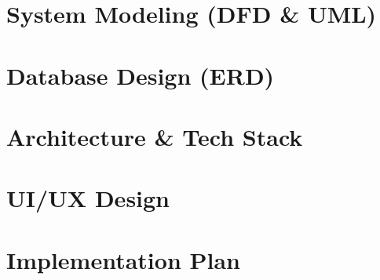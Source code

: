 \documentclass[11pt,a4paper]{report}
\begin{document}


\chapter{System Modeling (DFD \& UML)}
\label{sec:3-4}



\chapter{Database Design (ERD)}
\label{sec:3-5}



\chapter{Architecture \& Tech Stack}
\label{sec:3-6}



\chapter{UI/UX Design}
\label{sec:3-7}



\chapter{Implementation Plan}
\label{sec:3-8}



\end{document}
